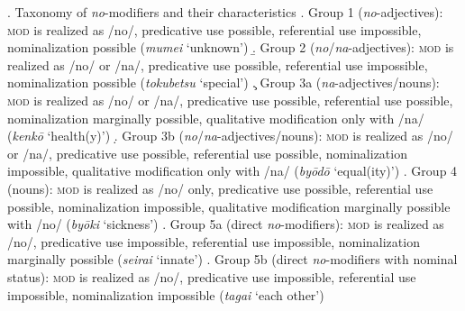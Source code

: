 \ex. \label{taxonomy list} Taxonomy of \textit{no}-modifiers and their characteristics
\a. Group 1 (\textit{no}-adjectives): \textsc{mod} is realized as /no/, predicative use possible, referential use impossible, nominalization possible (\textit{mumei} `unknown')
\b. Group 2 (\textit{no}/\textit{na}-adjectives): \textsc{mod} is realized as /no/ or /na/, predicative use possible, referential use impossible, nominalization possible (\textit{tokubetsu} `special')
\c. Group 3a (\textit{na}-adjectives/nouns): \textsc{mod} is realized as /no/ or /na/, predicative use possible, referential use possible, nominalization marginally possible, qualitative modification only with /na/ (\textit{kenkō} `health(y)')
\d. Group 3b (\textit{no}/\textit{na}-adjectives/nouns): \textsc{mod} is realized as /no/ or /na/, predicative use possible, referential use possible, nominalization impossible, qualitative modification only with /na/ (\textit{byōdō} `equal(ity)')
\e. Group 4 (nouns): \textsc{mod} is realized as /no/ only, predicative use possible, referential use possible, nominalization impossible, qualitative modification marginally possible with /no/ (\textit{byōki} `sickness')
\e. Group 5a (direct \textit{no}-modifiers): \textsc{mod} is realized as /no/, predicative use impossible, referential use impossible, nominalization marginally possible (\textit{seirai} `innate')
\e. Group 5b (direct \textit{no}-modifiers with nominal status): \textsc{mod} is realized as /no/, predicative use impossible, referential use impossible, nominalization impossible (\textit{tagai} `each other')



